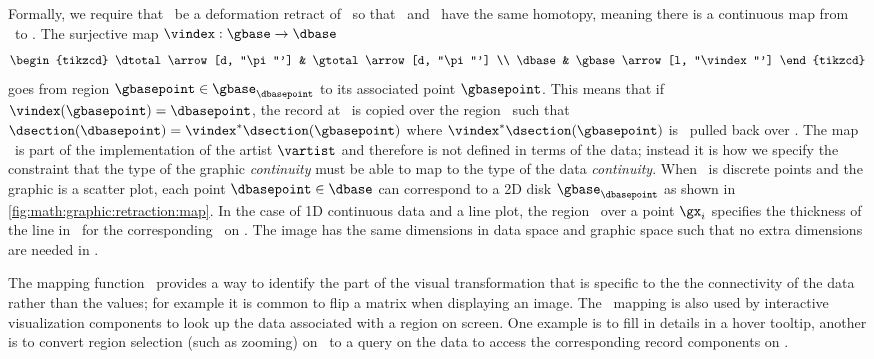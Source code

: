\documentclass[../main.tex]{subfiles}
\begin{document}
Formally, we require that \dbase\ be a deformation retract\cite{RetractionTopology2020} of \gbase\ so that \dbase\ and \gbase\ have the same homotopy, meaning there is a continuous map from \gbase\ to \dbase\cite{weissteinHomotopy}. The surjective map $\vindex: \gbase \rightarrow \dbase$ 
\begin{equation}
    \begin{tikzcd}
        \dtotal \arrow[d, "\pi"'] & \gtotal \arrow[d, "\pi"'] \\
        \dbase                   & \gbase \arrow[l, "\vindex"']
    \end{tikzcd}
    \label{eq:math:graphic:vindex}
\end{equation}
goes from region $\gbasepoint \in \gbase_{\dbasepoint}$ to its associated point $\gbasepoint$. This means that if $\vindex(\gbasepoint) = \dbasepoint$, the record at \dbasepoint\ is copied over the region \gbasepoint\ such that $\dsection(\dbasepoint)=\vindex^*\dsection(\gbasepoint)$ where $\vindex^*\dsection(\gbasepoint)$  is \dsection\ pulled back over \gbase. The map \vindex\ is part of the implementation of the artist $\mathcal{\vartist}$ and therefore is not defined in terms of the data; instead it is how we specify the constraint that the type of the graphic \textit{continuity} must be able to map to the type of the data \textit{continuity}. When \dbase\ is discrete points and the graphic is a scatter plot, each point $\dbasepoint \in \dbase$ can correspond to a 2D disk $\gbase_{\dbasepoint}$ as shown in \autoref{fig:math:graphic:retraction:map}. In the case of 1D continuous data and a line plot, the region \gy\ over a point $\gx_i$ specifies the thickness of the line in \gbase\ for the corresponding \dsection\ on \dbasepoint. The image has the same dimensions in data space and graphic space such that no extra dimensions are needed in \gbase. 

The mapping function \vindex\ provides a way to identify the part of the visual transformation that is specific to the the connectivity of the data rather than the values; for example it is common to flip a matrix when displaying an image. The \vindex\ mapping is also used by interactive visualization components to look up the data associated with a region on screen.  One example is to fill in details in a hover tooltip, another is to convert region selection (such as zooming) on \gbase\ to a query on the data to access the corresponding record components on \dbase.
\end{document}
